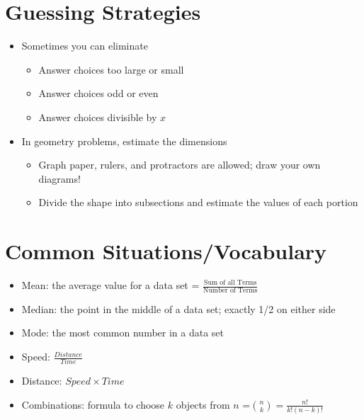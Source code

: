 \documentclass[11pt,letterpaper]{article}
\begin{document}
\begin{minipage}{\textwidth}
     \section*{Guessing Strategies}
     \begin{itemize}
          \item Sometimes you can eliminate
          \begin{itemize}
               \item Answer choices too large or small
               \item Answer choices odd or even
               \item Answer choices divisible by $x$
          \end{itemize}
          \item In geometry problems, estimate the dimensions
          \begin{itemize}
               \item Graph paper, rulers, and protractors are allowed; draw your own diagrams!
               \item Divide the shape into subsections and estimate the values of each portion
          \end{itemize}
        \end{itemize}
        \vspace{0.5cm}
\end{minipage}
\begin{minipage}{\textwidth}
     \section*{Common Situations/Vocabulary}
     \begin{itemize}
          \item Mean: the average value for a data set = $\frac{\text{Sum of all Terms}}{\text{Number of Terms}}$
          \item Median: the point in the middle of a data set; exactly 1/2 on either side
          \item Mode: the most common number in a data set
          \item Speed: $\frac{Distance}{Time}$
          \item Distance: $Speed \times Time$
          \item Combinations: formula to choose $k$ objects from $n$ =${{n}\choose{k}} = \frac{n!}{k!(n-k)!}$
     \end{itemize}
\end{minipage}
\end{document}
